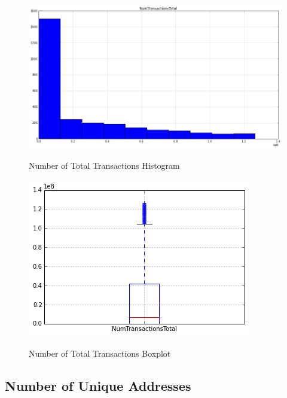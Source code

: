 \begin{figure}[bth]
  \myfloatalign
  {\includegraphics[width=1\linewidth]
    {gfx/n-transactions-total-histogram}}
  \caption{Number of Total Transactions
    Histogram}
  \label{fig:n-transactions-total-histogram}
\end{figure}

\begin{figure}[bth]
  \myfloatalign
  {\includegraphics[width=1\linewidth]
    {gfx/n-transactions-total-boxplot}}
  \caption{Number of Total Transactions
    Boxplot}
  \label{fig:n-transactions-total-boxplot}
\end{figure}

\clearpage

\subsection{Number of Unique Addresses}
\label{sec:n-unique-addresses}

